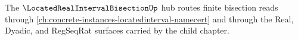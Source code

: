 The $\LocatedRealIntervalBisectionUp$ hub routes finite bisection reads through \autoref{ch:concrete-instances-locatedinterval-namecert} and through the Real, Dyadic, and RegSeqRat surfaces carried by the child chapter.


